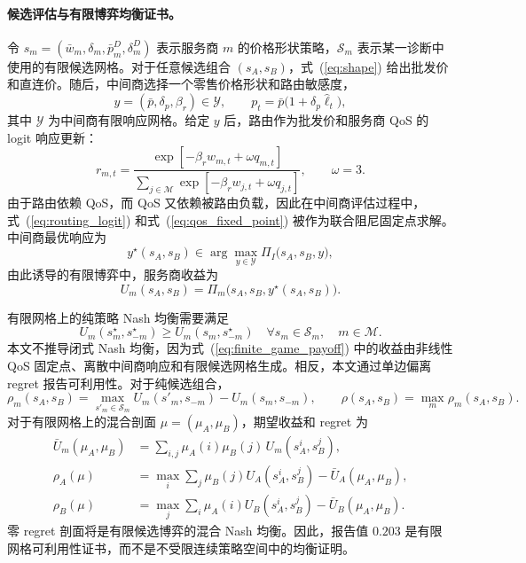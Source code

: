 \documentclass[UTF8,11pt,a4paper]{ctexart}
\newcommand{\M}{\mathcal{M}}
\begin{document}
\paragraph{候选评估与有限博弈均衡证书。}

令 $s_m=(\bar w_m,\delta_m,\bar p^D_m,\delta^D_m)$ 表示服务商 $m$ 的价格形状策略，$\mathcal S_m$ 表示某一诊断中使用的有限候选网格。对于任意候选组合 $(s_A,s_B)$，式~(\ref{eq:shape}) 给出批发价和直连价。随后，中间商选择一个零售价格形状和路由敏感度，
\[
  y=(\bar p,\delta_p,\beta_r)\in\mathcal Y ,
  \qquad
  p_t=\bar p\big(1+\delta_p\widehat{\ell}_t\big),
\]
其中 $\mathcal Y$ 为中间商有限响应网格。给定 $y$ 后，路由作为批发价和服务商 QoS 的 logit 响应更新：
\begin{equation}
  r_{m,t}
  =
  \frac{\exp[-\beta_r w_{m,t}+\omega q_{m,t}]}
       {\sum_{j\in\M}\exp[-\beta_r w_{j,t}+\omega q_{j,t}]},
  \qquad \omega=3 .
  \label{eq:routing_logit}
\end{equation}
由于路由依赖 QoS，而 QoS 又依赖被路由负载，因此在中间商评估过程中，式~(\ref{eq:routing_logit}) 和式~(\ref{eq:qos_fixed_point}) 被作为联合阻尼固定点求解。中间商最优响应为
\begin{equation}
  y^\star(s_A,s_B)\in
  \arg\max_{y\in\mathcal Y}
  \Pi_I\big(s_A,s_B,y\big),
  \label{eq:intermediary_best_response}
\end{equation}
由此诱导的有限博弈中，服务商收益为
\begin{equation}
  U_m(s_A,s_B)=
  \Pi_m\big(s_A,s_B,y^\star(s_A,s_B)\big).
  \label{eq:finite_game_payoff}
\end{equation}

有限网格上的纯策略 Nash 均衡需要满足
\begin{equation}
  U_m(s_m^\star,s_{-m}^\star)
  \ge
  U_m(s_m,s_{-m}^\star)
  \quad
  \forall s_m\in\mathcal S_m,\quad m\in\M .
  \label{eq:pure_nash}
\end{equation}
本文不推导闭式 Nash 均衡，因为式~(\ref{eq:finite_game_payoff}) 中的收益由非线性 QoS 固定点、离散中间商响应和有限候选网格生成。相反，本文通过单边偏离 regret 报告可利用性。对于纯候选组合，
\begin{equation}
  \rho_m(s_A,s_B)
  =
  \max_{s'_m\in\mathcal S_m}U_m(s'_m,s_{-m})
  -U_m(s_m,s_{-m}),
  \qquad
  \rho(s_A,s_B)=\max_m\rho_m(s_A,s_B).
  \label{eq:pure_regret}
\end{equation}
对于有限网格上的混合剖面 $\mu=(\mu_A,\mu_B)$，期望收益和 regret 为
\begin{align}
  \bar U_m(\mu_A,\mu_B)
  &=
  \sum_{i,j}\mu_A(i)\mu_B(j)\,U_m(s_A^i,s_B^j), \label{eq:mixed_payoff}\\
  \rho_A(\mu)
  &=
  \max_i\sum_j\mu_B(j)U_A(s_A^i,s_B^j)
  -\bar U_A(\mu_A,\mu_B), \nonumber\\
  \rho_B(\mu)
  &=
  \max_j\sum_i\mu_A(i)U_B(s_A^i,s_B^j)
  -\bar U_B(\mu_A,\mu_B). \label{eq:mixed_regret}
\end{align}
零 regret 剖面将是有限候选博弈的混合 Nash 均衡。因此，报告值 $0.203$ 是有限网格可利用性证书，而不是不受限连续策略空间中的均衡证明。
\end{document}
